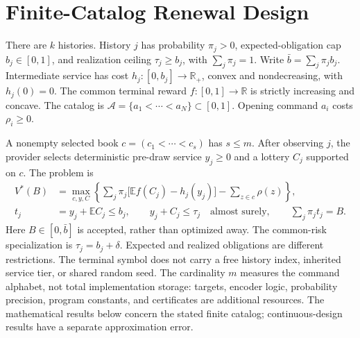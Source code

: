 \section{Finite-Catalog Renewal Design}\label{sec:model52}
There are $k$ histories. History $j$ has probability $\pi_j>0$, expected-obligation cap $b_j\in[0,1]$, and realization ceiling $\tau_j\geq b_j$, with $\sum_j\pi_j=1$. Write $\bar b=\sum_j\pi_jb_j$. Intermediate service has cost $h_j:[0,b_j]\to\mathbb R_+$, convex and nondecreasing, with $h_j(0)=0$. The common terminal reward $f:[0,1]\to\mathbb R$ is strictly increasing and concave. The catalog is $\mathcal A=\{a_1<\cdots<a_N\}\subset[0,1]$. Opening command $a_i$ costs $\rho_i\geq0$.

A nonempty selected book $c=(c_1<\cdots<c_s)$ has $s\leq m$. After observing $j$, the provider selects deterministic pre-draw service $y_j\geq0$ and a lottery $C_j$ supported on $c$. The problem is
\begin{align}
 V^*(B)&=\max_{c,y,C}\left\{\sum_j\pi_j\bigl[\mathbb E f(C_j)-h_j(y_j)\bigr]-\sum_{z\in c}\rho(z)\right\},\label{eq:original52}\\
 t_j&=y_j+\mathbb E C_j\leq b_j,\qquad y_j+C_j\leq\tau_j\quad\text{almost surely},\qquad \sum_j\pi_jt_j=B.\label{eq:constraints52}
\end{align}
Here $B\in[0,\bar b]$ is accepted, rather than optimized away. The common-risk specialization is $\tau_j=b_j+\delta$. Expected and realized obligations are different restrictions. The terminal symbol does not carry a free history index, inherited service tier, or shared random seed. The cardinality $m$ measures the command alphabet, not total implementation storage: targets, encoder logic, probability precision, program constants, and certificates are additional resources. The mathematical results below concern the stated finite catalog; continuous-design results have a separate approximation error.

